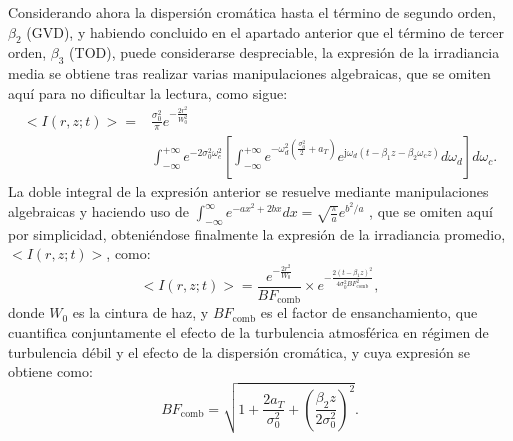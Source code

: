Considerando ahora la dispersión cromática hasta el término de segundo orden, $\beta_2$ (GVD), y habiendo concluido en el apartado anterior que el término de tercer orden, $\beta_3$ (TOD), puede considerarse despreciable, la expresión de la irradiancia media se obtiene tras realizar varias manipulaciones algebraicas, que se omiten aquí para no dificultar la lectura, como sigue:
\begin{equation}
\begin{split}
<I(r,z;t)>=&\frac{\sigma_{0}^{2}}{\pi}e^{-\frac{2r^{2}}{W_{0}^{2}}}\\
&\int_{-\infty}^{+\infty}e^{-2\sigma_{0}^{2}\omega_{c}^{2}}\left[\int_{-\infty}^{+\infty}e^{-\omega_{d}^{2}\left(\frac{\sigma_{0}^{2}}{2}+a_{T}\right)}e^{\mathrm{j}\omega_{d}\left(t-\beta_{1}z-\beta_{2}\omega_{c}z\right)}d\omega_{d}\right]d\omega_{c}.
\end{split}
\end{equation}
La doble integral de la expresión anterior se resuelve mediante manipulaciones algebraicas y haciendo uso de $\int_{-\infty}^{\infty}e^{-ax^2+2bx}dx=\sqrt{\frac{\pi}{a}}e^{b^2/a}$ \cite{Gradshteyn}, que se omiten aquí por simplicidad, obteniéndose finalmente la expresión de la irradiancia promedio, $<I(r,z;t)>$, como:
\begin{equation}
<I(r,z;t)>=\frac{e^{-\frac{2r^{2}}{W_{0}}}}{BF_{\text{comb}}}\times e^{-\frac{2(t-\beta_{1}z)^{2}}{4\sigma_{0}^{2}BF_{\text{comb}}^{2}}},
\end{equation}
donde $W_{0}$ es la cintura de haz, y $BF_{\text{comb}}$ es el factor de ensanchamiento, que cuantifica conjuntamente el efecto de la turbulencia atmosférica en régimen de turbulencia débil y el efecto de la dispersión cromática, y cuya expresión se obtiene como:
\begin{equation}
BF_{\text{comb}}=\sqrt{1+\frac{2a_{T}}{\sigma_{0}^{2}}+\left(\frac{\beta_{2}z}{2\sigma_{0}^{2}}\right)^{2}}.
\end{equation}


